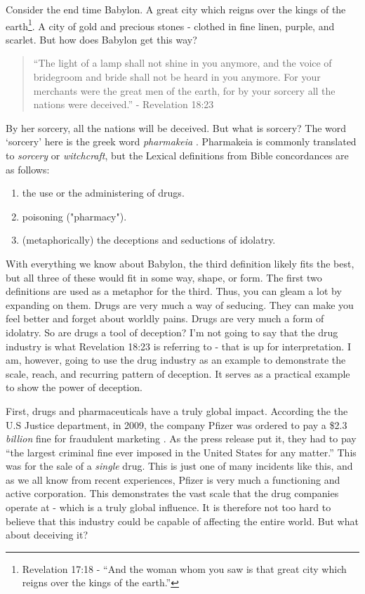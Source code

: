 \documentclass[10pt]{article}
\begin{document}
\begin{multicols}{2}
Consider the end time Babylon. A great city which reigns over the kings of the earth\footnote{Revelation 17:18 - ``And the woman whom you saw is that great city which reigns over the kings of the earth.''}. A city of gold and precious stones - clothed in fine linen, purple, and scarlet. But how does Babylon get this way?

\begin{quotation}
``The light of a lamp shall not shine in you anymore, and the voice of bridegroom and bride shall not be heard in you anymore. For your merchants were the great men of the earth, for by your sorcery all the nations were deceived.'' - Revelation 18:23
\end{quotation}

By her sorcery, all the nations will be deceived. But what is sorcery? The word `sorcery' here is the greek word \textit{pharmakeia} \cite{pharmakeia}. Pharmakeia is commonly translated to \textit{sorcery} or \textit{witchcraft}, but the Lexical definitions from Bible concordances are as follows:
\begin{enumerate}\itemsep0em 
\item the use or the administering of drugs.
\item poisoning ("pharmacy").
\item (metaphorically) the deceptions and seductions of idolatry.
\end{enumerate}
With everything we know about Babylon, the third definition likely fits the best, but all three of these would fit in some way, shape, or form. The first two definitions are used as a metaphor for the third. Thus, you can gleam a lot by expanding on them. Drugs are very much a way of seducing. They can make you feel better and forget about worldly pains. Drugs are very much a form of idolatry. So are drugs a tool of deception? I'm not going to say that the drug industry is what  Revelation 18:23 is referring to - that is up for interpretation. I am, however, going to use the drug industry as an example to demonstrate the scale, reach, and recurring pattern of deception. It serves as a practical example to show the power of deception.

First, drugs and pharmaceuticals have a truly global impact. According the the U.S Justice department, in 2009, the company Pfizer was ordered to pay a \$2.3 \textit{billion} fine for fraudulent marketing \cite{pfizer_fine}. As the press release put it, they had to pay ``the largest criminal fine ever imposed in the United States for any matter.'' This was for the sale of a \textit{single} drug. This is just one of many incidents like this, and as we all know from recent experiences, Pfizer is very much a functioning and active corporation. This demonstrates the vast scale that the drug companies operate at - which is a truly global influence. It is therefore not too hard to believe that this industry could be capable of affecting the entire world. But what about deceiving it?


\end{multicols}
\end{document}
